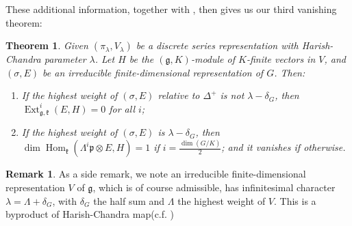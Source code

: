 \documentclass[11pt]{report}
\theoremstyle{definition}
\newtheorem{Rmk}{Remark}[chapter]
\theoremstyle{plain}
\newtheorem{Theo}[Def]{Theorem}
\DeclareMathOperator{\Ext}{Ext}
\DeclareMathOperator{\Hom}{Hom}
\newcommand{\Lie}[1]{\mathfrak{#1}}
\begin{document}
These additional information, together with , then gives us our third vanishing theorem:
\begin{Theo}\label{borel2.5.3}
	\textnormal{\cite[Chapter~II, Theorem~5.3]{borel2013}} Given $(\pi_\lambda,V_\lambda)$ be a discrete series representation with Harish-Chandra parameter $\lambda$. Let $H$ be the $(\Lie{g},K)$-module of $K$-finite vectors in $V$, and $(\sigma,E)$ be an irreducible finite-dimensional representation of $G$. Then:
	\begin{enumerate}
		\item If the highest weight of $(\sigma, E)$ relative to $\Delta^+$ is not $\lambda-\delta_G$, then $\Ext^i_{\Lie{g}, \Lie{k}}(E,H)=0$ for all $i$;
		\item If the highest weight of $(\sigma,E)$ is $\lambda-\delta_G$, then $\dim \Hom_{\Lie{k}}(\Lambda^i\Lie{p}\otimes E, H)=1$ if $i=\frac{\dim(G/K)}{2}$; and it vanishes if otherwise.
	\end{enumerate}
\end{Theo}
\begin{Rmk}
	As a side remark, we note an irreducible finite-dimensional representation $V$ of $\Lie{g}$, which is of course admissible, has infinitesimal character $\lambda=\Lambda+\delta_G$, with $\delta_G$ the half sum and $\Lambda$ the highest weight of $V$. This is a byproduct of Harish-Chandra map(c.f. \cite[Proposition~5.42ff]{knapp2013})
\end{Rmk}
\end{document}
